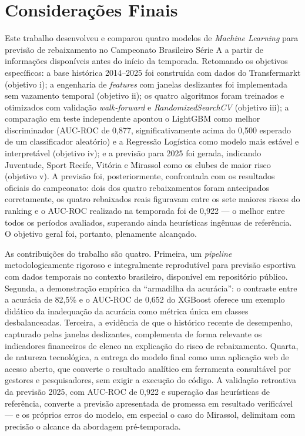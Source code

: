 \documentclass[
    article,
    12pt,
    oneside,
    a4paper,
    english,
    brazilian
    ]{abntex2}
\begin{document}
\section{Considerações Finais}

Este trabalho desenvolveu e comparou quatro modelos de \textit{Machine Learning} para previsão de rebaixamento no Campeonato Brasileiro Série A a partir de informações disponíveis antes do início da temporada. Retomando os objetivos específicos: a base histórica 2014--2025 foi construída com dados do Transfermarkt (objetivo i); a engenharia de \textit{features} com janelas deslizantes foi implementada sem vazamento temporal (objetivo ii); os quatro algoritmos foram treinados e otimizados com validação \textit{walk-forward} e \textit{RandomizedSearchCV} (objetivo iii); a comparação em teste independente apontou o LightGBM como melhor discriminador (AUC-ROC de 0,877, significativamente acima do 0,500 esperado de um classificador aleatório) e a Regressão Logística como modelo mais estável e interpretável (objetivo iv); e a previsão para 2025 foi gerada, indicando Juventude, Sport Recife, Vitória e Mirassol como os clubes de maior risco (objetivo v). A previsão foi, posteriormente, confrontada com os resultados oficiais do campeonato: dois dos quatro rebaixamentos foram antecipados corretamente, os quatro rebaixados reais figuravam entre os sete maiores riscos do ranking e o AUC-ROC realizado na temporada foi de 0,922 --- o melhor entre todos os períodos avaliados, superando ainda heurísticas ingênuas de referência. O objetivo geral foi, portanto, plenamente alcançado.

As contribuições do trabalho são quatro. Primeira, um \textit{pipeline} metodologicamente rigoroso e integralmente reprodutível para previsão esportiva com dados temporais no contexto brasileiro, disponível em repositório público. Segunda, a demonstração empírica da ``armadilha da acurácia'': o contraste entre a acurácia de 82,5\% e o AUC-ROC de 0,652 do XGBoost oferece um exemplo didático da inadequação da acurácia como métrica única em classes desbalanceadas. Terceira, a evidência de que o histórico recente de desempenho, capturado pelas janelas deslizantes, complementa de forma relevante os indicadores financeiros de elenco na explicação do risco de rebaixamento. Quarta, de natureza tecnológica, a entrega do modelo final como uma aplicação web de acesso aberto, que converte o resultado analítico em ferramenta consultável por gestores e pesquisadores, sem exigir a execução do código. A validação retroativa da previsão 2025, com AUC-ROC de 0,922 e superação das heurísticas de referência, converte a previsão apresentada de promessa em resultado verificável --- e os próprios erros do modelo, em especial o caso do Mirassol, delimitam com precisão o alcance da abordagem pré-temporada.
\end{document}
